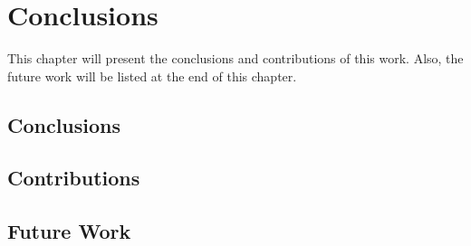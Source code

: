 \chapter{Conclusions}
\label{chp:conclusions}

This chapter will present the conclusions and contributions of this work. Also, the future work will be listed at the end of this chapter.

\section{Conclusions}

\section{Contributions}

\section{Future Work}

